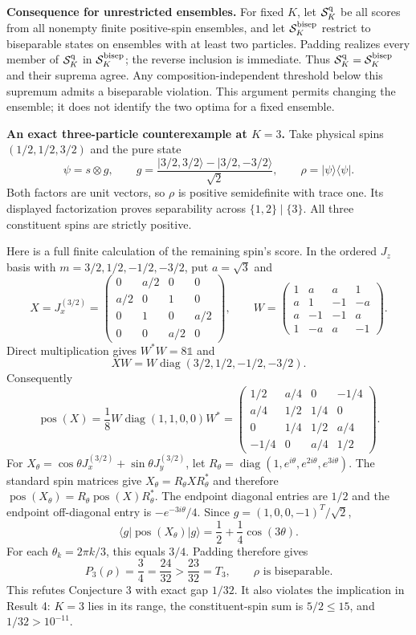 \documentclass[11pt,a4paper]{article}
\newcommand{\pos}{\operatorname{pos}}
\newcommand{\ket}[1]{\lvert #1\rangle}
\newcommand{\bra}[1]{\langle #1\rvert}
\newcommand{\id}{\mathbb{1}}
\begin{document}
\textbf{Consequence for unrestricted ensembles.}
For fixed $K$, let $\mathcal S_K^{\rm q}$ be all scores from all nonempty
finite positive-spin ensembles, and let $\mathcal S_K^{\rm bisep}$ restrict
to biseparable states on ensembles with at least two particles. Padding
realizes every member of $\mathcal S_K^{\rm q}$ in
$\mathcal S_K^{\rm bisep}$; the reverse inclusion is immediate. Thus
$\mathcal S_K^{\rm q}=\mathcal S_K^{\rm bisep}$ and their suprema agree.
Any composition-independent threshold below this supremum admits a
biseparable violation. This argument permits changing the ensemble;
it does not identify the two optima for a fixed ensemble.

\newpage
\textbf{An exact three-particle counterexample at $K=3$.}
Take physical spins $(1/2,1/2,3/2)$ and the pure state
\[
\psi=s\otimes g,\qquad
g=\frac{\ket{3/2,3/2}-\ket{3/2,-3/2}}{\sqrt2},\qquad
\rho=\ket{\psi}\bra{\psi}.
\]
Both factors are unit vectors, so $\rho$ is positive semidefinite with
trace one. Its displayed factorization proves separability across
$\{1,2\}\mid\{3\}$. All three constituent spins are strictly positive.

Here is a full finite calculation of the remaining spin's score. In the
ordered $J_z$ basis with $m=3/2,1/2,-1/2,-3/2$, put $a=\sqrt3$ and
\[
X=J_x^{(3/2)}=
\begin{pmatrix}
0&a/2&0&0\\ a/2&0&1&0\\0&1&0&a/2\\0&0&a/2&0
\end{pmatrix},\qquad
W=\begin{pmatrix}
1&a&a&1\\a&1&-1&-a\\a&-1&-1&a\\1&-a&a&-1
\end{pmatrix}.
\]
Direct multiplication gives $W^*W=8\id$ and
\[
XW=W\operatorname{diag}(3/2,1/2,-1/2,-3/2).
\]
Consequently
\[
\pos(X)=\frac18W\operatorname{diag}(1,1,0,0)W^*
=\begin{pmatrix}
1/2&a/4&0&-1/4\\a/4&1/2&1/4&0\\
0&1/4&1/2&a/4\\-1/4&0&a/4&1/2
\end{pmatrix}.
\]
For $X_\theta=\cos\theta J_x^{(3/2)}+\sin\theta J_y^{(3/2)}$, let
$R_\theta=\operatorname{diag}(1,e^{i\theta},e^{2i\theta},e^{3i\theta})$.
The standard spin matrices give
$X_\theta=R_\theta X R_\theta^*$ and therefore
$\pos(X_\theta)=R_\theta\pos(X)R_\theta^*$.
The endpoint diagonal entries are $1/2$ and the endpoint off-diagonal
entry is $-e^{-3i\theta}/4$. Since $g=(1,0,0,-1)^T/\sqrt2$,
\[
\bra{g}\pos(X_\theta)\ket{g}
=\frac12+\frac14\cos(3\theta).
\]
For each $\theta_k=2\pi k/3$, this equals $3/4$.
Padding therefore gives
\[
\boxed{P_3(\rho)=\frac34=\frac{24}{32}>\frac{23}{32}=T_3,
\qquad \rho\text{ is biseparable}.}
\]
This refutes Conjecture 3 with exact gap $1/32$. It also violates the
implication in Result 4: $K=3$ lies in its range, the constituent-spin sum
is $5/2\leq15$, and $1/32>10^{-11}$.
\end{document}
